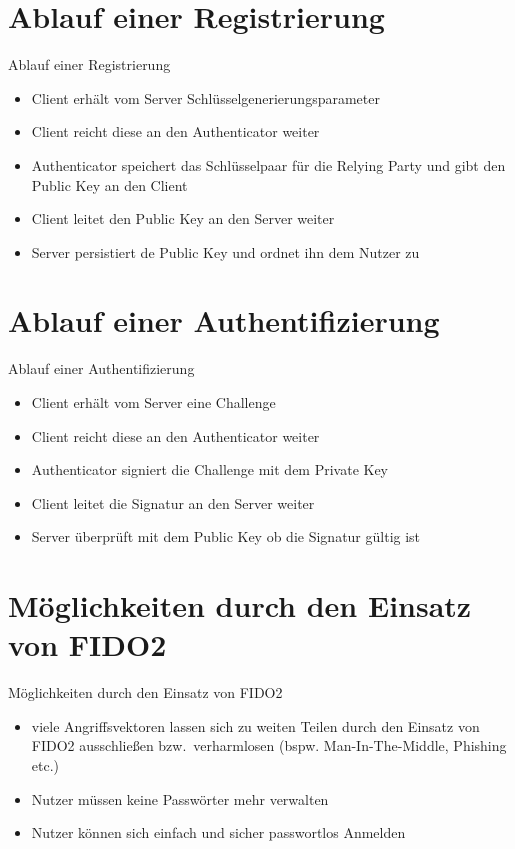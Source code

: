 \documentclass{beamer}
\begin{document}
\section{Ablauf einer Registrierung}
\begin{frame}{Ablauf einer Registrierung}
	\begin{itemize}
		\item Client erhält vom Server Schlüsselgenerierungsparameter
		\item Client reicht diese an den Authenticator weiter
		\item Authenticator speichert das Schlüsselpaar für die Relying Party und gibt den Public Key an den Client
		\item Client leitet den Public Key an den Server weiter
		\item Server persistiert de Public Key und ordnet ihn dem Nutzer zu
	\end{itemize}
\end{frame}

\section{Ablauf einer Authentifizierung}
\begin{frame}{Ablauf einer Authentifizierung}
	\begin{itemize}
		\item Client erhält vom Server eine Challenge
		\item Client reicht diese an den Authenticator weiter
		\item Authenticator signiert die Challenge mit dem Private Key
		\item Client leitet die Signatur an den Server weiter
		\item Server überprüft mit dem Public Key ob die Signatur gültig ist
	\end{itemize}
\end{frame}

\section{Möglichkeiten durch den Einsatz von FIDO2}
\begin{frame}{Möglichkeiten durch den Einsatz von FIDO2}
	\begin{itemize}
		\item viele Angriffsvektoren lassen sich zu weiten Teilen durch den
			Einsatz von FIDO2 ausschließen bzw.\ verharmlosen (bspw.
			Man-In-The-Middle, Phishing etc.)
		\item Nutzer müssen keine Passwörter mehr verwalten
		\item Nutzer können sich einfach und sicher passwortlos Anmelden
	\end{itemize}
\end{frame}
\end{document}
